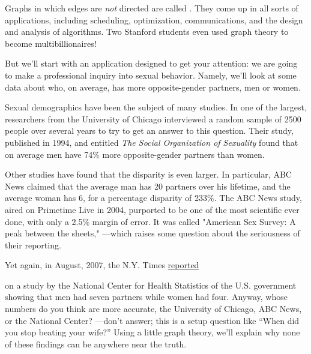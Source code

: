 %
%
%
%
%

\label{simple_graphs_chap}

Graphs in which edges are \emph{not} directed are called .  They come up in all sorts of applications, including
scheduling, optimization, communications, and the design and analysis
of algorithms.  Two Stanford students even used graph theory to become
multibillionaires!

But we'll start with an application designed to get your attention: we are
going to make a professional inquiry into sexual behavior.  Namely, we'll
look at some data about who, on average, has more opposite-gender
partners, men or women.

Sexual demographics have been the subject of many studies.  In one of the
largest, researchers from the University of Chicago interviewed a random
sample of 2500 people over several years to try to get an answer to this
question.  Their study, published in 1994, and entitled \emph{The Social
  Organization of Sexuality} found that on average men have 74\% more
opposite-gender partners than women.

Other studies have found that the disparity is even larger.  In
particular, ABC News claimed that the average man has 20 partners over his
lifetime, and the average woman has 6, for a percentage disparity of
233\%.  The ABC News study, aired on Primetime Live in 2004, purported to
be one of the most scientific ever done, with only a 2.5\% margin of
error.  It was called "American Sex Survey: A peak between the sheets,"
---which raises some question about the seriousness of their reporting.

Yet again, in August, 2007, the N.Y. Times
\href{The-Myth-the-Math-the-Sex.pdf}{reported}

on a study by the National Center for Health Statistics of the U.S. government
showing that men had seven partners while women had four.  Anyway, whose numbers do
you think are more accurate, the University of Chicago, ABC News, or the National
Center? ---don't answer; this is a setup question like ``When did you stop beating
your wife?''  Using a little graph theory, we'll explain why none of these findings
can be anywhere near the truth.

